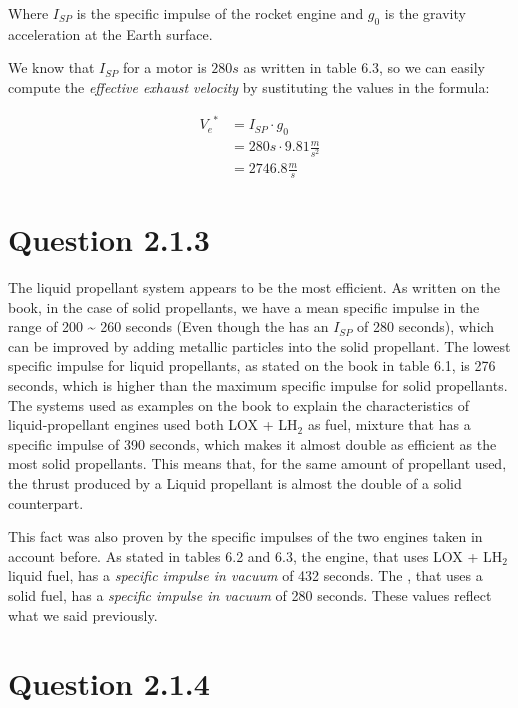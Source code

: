 \documentclass[9pt,a4paper]{scrreprt}
\begin{document}
      Where $I_{SP}$ is the specific impulse of the rocket engine and $g_0$
      is the gravity acceleration at the Earth surface.
      
      We know that $I_{SP}$ for a  motor is $280s$ as
      written in table 6.3, so we can easily compute the \emph{effective
      exhaust velocity} by sustituting the values in the formula:

      \begin{align*}
        {V_e}^* &= I_{SP} \cdot g_0 \\
                &= 280s \cdot 9.81 \frac{m}{s^2} \\
                &= 2746.8 \frac{m}{s}
      \end{align*}

    \section*{Question 2.1.3}
     
      The liquid propellant system appears to be the most efficient. As written on the book, in the case of solid propellants,
      we have a mean specific impulse in the range of 200 \textasciitilde{} 260 seconds (Even though the  has
      an $I_{SP}$ of 280 seconds), which can be improved by adding
      metallic particles into the solid propellant. The lowest specific impulse for liquid propellants, as stated on the book in
      table 6.1, is 276 seconds, which is higher than the maximum specific impulse for solid propellants. The systems used as examples
      on the book to explain the characteristics of liquid-propellant engines used both LOX + LH$_2$ as fuel, mixture that has a specific
      impulse of 390 seconds, which makes it almost double as efficient as the most solid propellants. This means that, for the same amount
      of propellant used, the thrust produced by a Liquid propellant is almost the double of a solid counterpart.

      This fact was also proven by the specific impulses of the two engines taken in account before. As stated in tables 6.2 and 6.3, the
       engine, that uses LOX + LH$_2$ liquid fuel, has a \emph{specific impulse in vacuum} of 432 seconds.
      The , that uses a solid fuel, has a \emph{specific impulse in vacuum} of 280 seconds. These values reflect what we said
      previously.
    
    \section*{Question 2.1.4}
\end{document}
